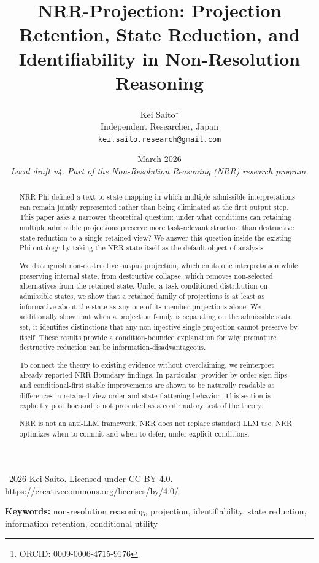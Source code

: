 \documentclass[11pt,a4paper]{article}
\title{\textbf{NRR-Projection: Projection Retention, State Reduction, and Identifiability in Non-Resolution Reasoning}}
\author{
  Kei Saito\thanks{ORCID: 0009-0006-4715-9176} \\
  Independent Researcher, Japan \\
  \texttt{kei.saito.research@gmail.com}
}
\date{March 2026 \\[0.5em]
\textit{Local draft v4. Part of the Non-Resolution Reasoning (NRR) research program.}}
\begin{document}
\maketitle

\begin{center}
\textcopyright\ 2026 Kei Saito.
Licensed under CC BY 4.0.\\
\url{https://creativecommons.org/licenses/by/4.0/}
\end{center}

\begin{abstract}
NRR-Phi defined a text-to-state mapping in which multiple admissible interpretations can remain jointly represented rather than being eliminated at the first output step. This paper asks a narrower theoretical question: under what conditions can retaining multiple admissible projections preserve more task-relevant structure than destructive state reduction to a single retained view? We answer this question inside the existing Phi ontology by taking the NRR state itself as the default object of analysis.

We distinguish non-destructive output projection, which emits one interpretation while preserving internal state, from destructive collapse, which removes non-selected alternatives from the retained state. Under a task-conditioned distribution on admissible states, we show that a retained family of projections is at least as informative about the state as any one of its member projections alone. We additionally show that when a projection family is separating on the admissible state set, it identifies distinctions that any non-injective single projection cannot preserve by itself. These results provide a condition-bounded explanation for why premature destructive reduction can be information-disadvantageous.

To connect the theory to existing evidence without overclaiming, we reinterpret already reported NRR-Boundary findings. In particular, provider-by-order sign flips and conditional-first stable improvements are shown to be naturally readable as differences in retained view order and state-flattening behavior. This section is explicitly post hoc and is not presented as a confirmatory test of the theory.

NRR is not an anti-LLM framework. NRR does not replace standard LLM use. NRR optimizes when to commit and when to defer, under explicit conditions.
\end{abstract}

\noindent\textbf{Keywords:} non-resolution reasoning, projection, identifiability, state reduction, information retention, conditional utility
\end{document}
